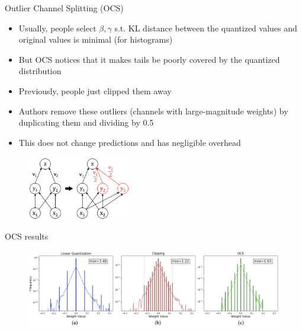 \documentclass[10pt, handout]{beamer}
\begin{document}
\begin{frame}{Outlier Channel Splitting (OCS)}
    \begin{itemize}
        \item\pause Usually, people select $\beta,\gamma$ s.t. KL distance between the quantized values and original values is minimal (for histograms)
        \item\pause But OCS\cite{OCS} notices that it makes tails be poorly covered by the quantized distribution
        \item\pause Previously, people just clipped them away
        \item\pause Authors remove these outliers (channels with large-magnitude weights) by duplicating them and dividing by 0.5
        \item\pause This does not change predictions and has negligible overhead
    \end{itemize}
    
    \begin{figure}
        \centering
        \includegraphics[width=0.4\textwidth]{images/ocs-diag.png}
    \end{figure}
\end{frame}

\begin{frame}{OCS results}
    \begin{figure}
        \centering
        \includegraphics[width=\textwidth]{images/ocs-hists.png}
    \end{figure}
\end{frame}
\end{document}
